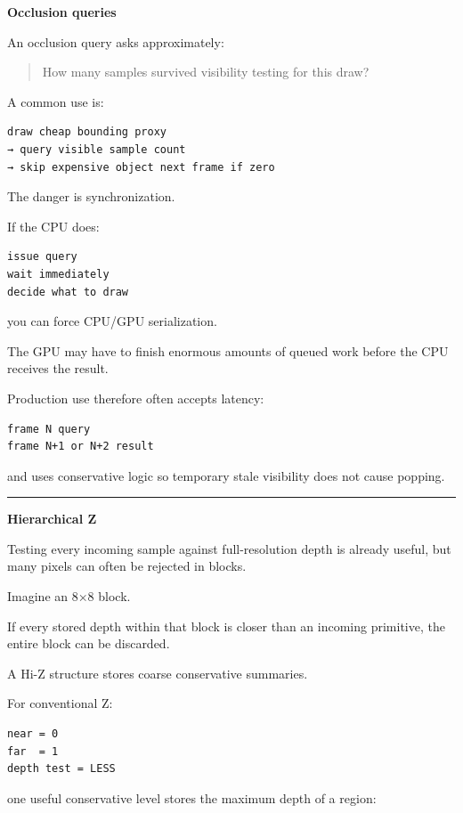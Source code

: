 \textbf{Occlusion queries}

An occlusion query asks approximately:

\begin{quote}
How many samples survived visibility testing for this draw?
\end{quote}

A common use is:

\begin{verbatim}
draw cheap bounding proxy
→ query visible sample count
→ skip expensive object next frame if zero
\end{verbatim}

The danger is synchronization.

If the CPU does:

\begin{verbatim}
issue query
wait immediately
decide what to draw
\end{verbatim}

you can force CPU/GPU serialization.

The GPU may have to finish enormous amounts of queued work before the CPU receives the result.

Production use therefore often accepts latency:

\begin{verbatim}
frame N query
frame N+1 or N+2 result
\end{verbatim}

and uses conservative logic so temporary stale visibility does not cause popping.

\begin{center}\rule{0.5\linewidth}{0.5pt}\end{center}

\textbf{Hierarchical Z}

Testing every incoming sample against full-resolution depth is already useful, but many pixels can often be rejected in blocks.

Imagine an 8×8 block.

If every stored depth within that block is closer than an incoming primitive, the entire block can be discarded.

A Hi-Z structure stores coarse conservative summaries.

For conventional Z:

\begin{verbatim}
near = 0
far  = 1
depth test = LESS
\end{verbatim}

one useful conservative level stores the maximum depth of a region:

